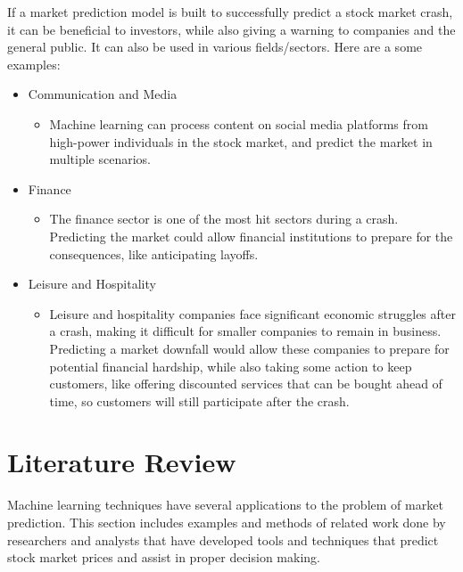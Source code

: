 \documentclass{article}
\begin{document}
If a market prediction model is built to successfully predict a stock market crash, it can be beneficial to investors, while also giving a warning to companies and the general public. It can also be used in various fields/sectors. Here are a some examples: 

	\begin{itemize}
		\item Communication and Media
			\begin{itemize}
				\item Machine learning can process content on social media platforms from high-power individuals in the stock market, and predict the market in multiple scenarios.   
			\end{itemize}
		\item Finance
			\begin{itemize}
				\item The finance sector is one of the most hit sectors during a crash. Predicting the market could allow financial institutions to prepare for the consequences, like anticipating layoffs.
			\end{itemize}
		\item Leisure and Hospitality 
			\begin{itemize}
				\item Leisure and hospitality companies face significant economic struggles after a crash, making it difficult for smaller companies to remain in business. Predicting a market downfall would allow these companies to prepare for potential financial hardship, while also taking some action to keep customers, like offering discounted services that can be bought ahead of time, so customers will still participate after the crash. 
			\end{itemize}
	\end{itemize}
 
\section{Literature Review} 
Machine learning techniques have several applications to the problem of market prediction. This section includes examples and methods of related work done by researchers and analysts that have developed tools and techniques that predict stock market prices and assist in proper decision making.
\end{document}
